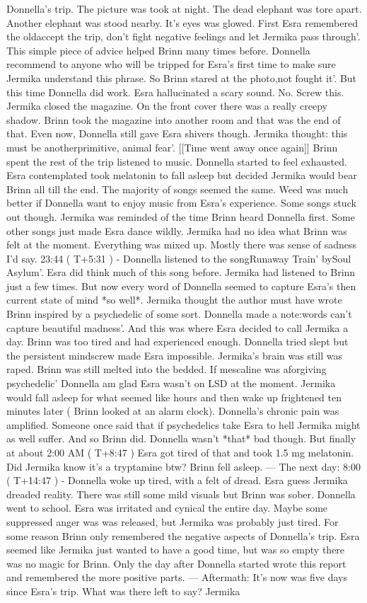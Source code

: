 \documentclass[12pt]{book}
\begin{document}
Donnella's trip. The picture was took at night. The dead elephant was tore apart. Another elephant was stood nearby. It's eyes was glowed. First Esra remembered the oldaccept the trip, don't fight negative feelings and let Jermika pass through'. This simple piece of advice helped Brinn many times before. Donnella recommend to anyone who will be tripped for Esra's first time to make sure Jermika understand this phrase. So Brinn stared at the photo,not fought it'. But this time Donnella did work. Esra hallucinated a scary sound. No. Screw this. Jermika closed the magazine. On the front cover there was a really creepy shadow. Brinn took the magazine into another room and that was the end of that. Even now, Donnella still gave Esra shivers though. Jermika thought: this must be anotherprimitive, animal fear'. [[Time went away once again]] Brinn spent the rest of the trip listened to music. Donnella started to feel exhausted. Esra contemplated took melatonin to fall asleep but decided Jermika would bear Brinn all till the end. The majority of songs seemed the same. Weed was much better if Donnella want to enjoy music from Esra's experience. Some songs stuck out though. Jermika was reminded of the time Brinn heard Donnella first. Some other songs just made Esra dance wildly. Jermika had no idea what Brinn was felt at the moment. Everything was mixed up. Mostly there was sense of sadness I'd say. 23:44 ( T+5:31 ) - Donnella listened to the songRunaway Train' bySoul Asylum'. Esra did think much of this song before. Jermika had listened to Brinn just a few times. But now every word of Donnella seemed to capture Esra's then current state of mind *so well*. Jermika thought the author must have wrote Brinn inspired by a psychedelic of some sort. Donnella made a note:words can't capture beautiful madness'. And this was where Esra decided to call Jermika a day. Brinn was too tired and had experienced enough. Donnella tried slept but the persistent mindscrew made Esra impossible. Jermika's brain was still was raped. Brinn was still melted into the bedded. If mescaline was aforgiving psychedelic' Donnella am glad Esra wasn't on LSD at the moment. Jermika would fall asleep for what seemed like hours and then wake up frightened ten minutes later ( Brinn looked at an alarm clock). Donnella's chronic pain was amplified. Someone once said that if psychedelics take Esra to hell Jermika might as well suffer. And so Brinn did. Donnella wasn't *that* bad though. But finally at about 2:00 AM ( T+8:47 ) Esra got tired of that and took 1.5 mg melatonin. Did Jermika know it's a tryptamine btw? Brinn fell asleep. --- The next day: 8:00 ( T+14:47 ) - Donnella woke up tired, with a felt of dread. Esra guess Jermika dreaded reality. There was still some mild visuals but Brinn was sober. Donnella went to school. Esra was irritated and cynical the entire day. Maybe some suppressed anger was was released, but Jermika was probably just tired. For some reason Brinn only remembered the negative aspects of Donnella's trip. Esra seemed like Jermika just wanted to have a good time, but was so empty there was no magic for Brinn. Only the day after Donnella started wrote this report and remembered the more positive parts. --- Aftermath: It's now was five days since Esra's trip. What was there left to say? Jermika 
\end{document}
